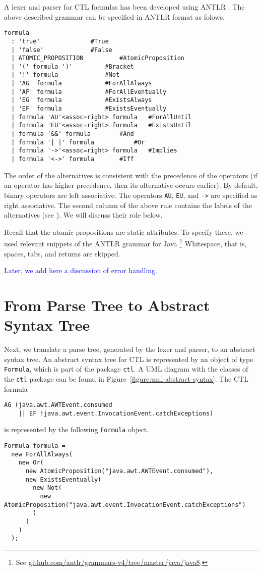 \documentclass[12pt]{article}
\theoremstyle{definition}
\begin{document}
A lexer and parser for CTL formulas has been developed using ANTLR \cite{P13}.  The above described grammar can be specified in ANTLR format as folows.
\begin{lstlisting}
formula
  : 'true'				#True
  | 'false'				#False
  | ATOMIC_PROPOSITION			#AtomicProposition
  | '(' formula ')'			#Bracket
  | '!' formula				#Not
  | 'AG' formula			#ForAllAlways
  | 'AF' formula			#ForAllEventually
  | 'EG' formula			#ExistsAlways
  | 'EF' formula			#ExistsEventually
  | formula 'AU'<assoc=right> formula   #ForAllUntil
  | formula 'EU'<assoc=right> formula   #ExistsUntil
  | formula '&&' formula		#And
  | formula '| |' formula   		#Or
  | formula '->'<assoc=right> formula   #Implies
  | formula '<->' formula		#Iff
\end{lstlisting}
The order of the alternatives is consistent with the precedence of the operators (if an operator has higher precedence, then its alternative occurs earlier).  By default, binary operators are left associative.  The operators \lstinline{AU}, \lstinline{EU}, and \lstinline{->} are specified as right associative.  The second column of the above rule contains the labels of the alternatives (see \cite[Section~8.2]{P13}).  We will discuss their role below.

Recall that the atomic propositions are static attributes.  To specify these, we used relevant snippets of the ANTLR grammar for Java%
\footnote{See \href{https://github.com/antlr/grammars-v4/tree/master/java/java8}{github.com/antlr/grammars-v4/tree/master/java/java8}.}
Whitespace, that is, spaces, tabs, and returns are skipped.

\textcolor{blue}{Later, we add here a discussion of error handling.}

\section{From Parse Tree to Abstract Syntax Tree}

Next, we translate a parse tree, generated by the lexer and parser, to an abstract syntax tree.  An abstract syntax tree for CTL is represented by an object of type \lstinline{Formula}, which is part of the package \lstinline{ctl}.  A UML diagram with the classes of the \lstinline{ctl} package can be found in Figure~\ref{figure:uml-abstract-syntax}.  The CTL formula
\begin{lstlisting}
AG (java.awt.AWTEvent.consumed 
    || EF !java.awt.event.InvocationEvent.catchExceptions)
\end{lstlisting}
is represented by the following \lstinline{Formula} object.
\begin{lstlisting}
Formula formula =
  new ForAllAlways(
    new Or(
      new AtomicProposition("java.awt.AWTEvent.consumed"),
      new ExistsEventually(
        new Not(
          new AtomicProposition("java.awt.event.InvocationEvent.catchExceptions")
        )
      )
    )
  );
\end{lstlisting}
\end{document}
